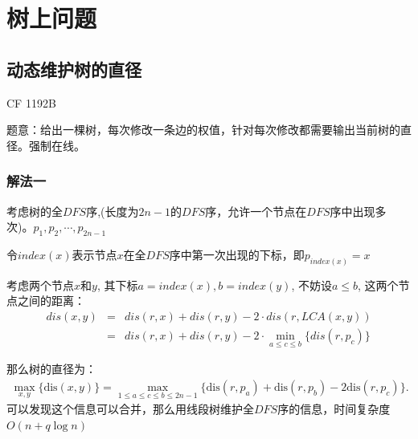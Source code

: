 \section{树上问题}
\subsection{动态维护树的直径}
CF 1192B\par
题意：给出一棵树，每次修改一条边的权值，针对每次修改都需要输出当前树的直径。强制在线。\par

\subsubsection{解法一}

考虑树的全$DFS$序,(长度为$2n - 1$的$DFS$序，允许一个节点在$DFS$序中出现多次)。$p_1, p_2, \cdots, p_{2n - 1}$\par
令$index(x)$表示节点$x$在全$DFS$序中第一次出现的下标，即$p_{index(x)} = x$\par
考虑两个节点$x$和$y$, 其下标$a = index(x), b = index(y)$, 不妨设$a \leq b$, 这两个节点之间的距离：
\begin{eqnarray*}
dis(x, y) &=& dis(r, x) + dis(r, y) - 2 \cdot dis(r, LCA(x, y)) \\
&=& dis(r, x) + dis(r, y) - 2 \cdot \min\limits_{a \leq c \leq b} \{dis(r, p_c)\}
\end{eqnarray*}

那么树的直径为：
\begin{eqnarray*}
\max_{x, y}\{\text{dis}(x,y)\}  = \max_{1 \leq a \leq c \leq b \leq 2n-1 } \{ \text{dis}(r, p_a)+\text{dis}(r, p_b)-2\text{dis}(r, p_c) \}.
\end{eqnarray*}
可以发现这个信息可以合并，那么用线段树维护全$DFS$序的信息，时间复杂度$O(n + q\log n)$

